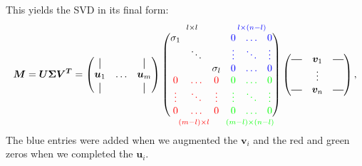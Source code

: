     This yields the SVD in its final form:
    \begin{align}
        \bm{M} = \bm{U \Sigma V^T} =
         \begin{pmatrix}
            \vertbar &        & \vertbar \\
            \bm{u}_1 & \hdots & \bm{u}_m \\
            \vertbar &        & \vertbar 
        \end{pmatrix}
        \overset{\quad  l \x l \quad \quad \quad\quad \blue{l \x (n-l)}}{
        \underset{\ \ \ \red{(m-l) \x l} \ \ \quad \green{(m-l) \x (n-l)}}{
        \begin{pmatrix}
                \sigma_1 &        &          & \blue{0      } & \blue{\hdots}  &  \blue{0}  \\
                         & \ddots &          & \blue{\vdots } & \blue{\ddots }  & \blue{\vdots }  \\
                         &        & \sigma_l & \blue{0      } & \blue{\hdots }  & \blue{0      }  \\
                \red{0     }   & \red{\hdots} & \red{0     } & \green{0     }  & \green{\hdots} & \green{0} \\
                \red{\vdots}   & \red{\ddots} & \red{\vdots} & \green{\vdots}  & \green{\ddots} & \green{\vdots}   \\
                \red{0     }   & \red{\hdots} & \red{0     } & \green{0     }  & \green{\hdots} & \green{0}
        \end{pmatrix}}}
        \begin{pmatrix}
            \horzbar & \bm{v}_1     & \horzbar \\
                     & \vdots            &          \\
            \horzbar & \bm{v}_n     & \horzbar \\
        \end{pmatrix},
    \end{align}
    The blue entries were added when we augmented the $\bm{v}_i$ and the red and green zeros when we 
    completed the $\bm{u}_i$.
